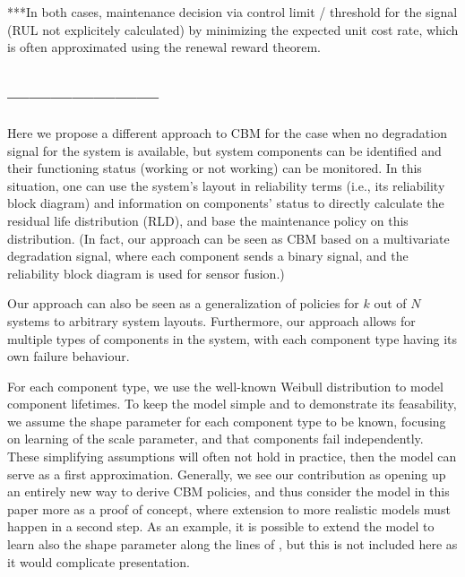 \documentclass[authoryear]{elsarticle}
\begin{document}
***In both cases, maintenance decision via control limit / threshold for the signal
(RUL not explicitely calculated)
by minimizing the expected unit cost rate,
which is often approximated using the renewal reward theorem.

\subsection*{---------------------}

Here we propose a different approach to CBM
for the case when no degradation signal for the system is available,
but system components can be identified and their functioning status
(working or not working) can be monitored.
In this situation, one can use the system's layout in reliability terms
(i.e., its reliability block diagram) and information on components' status
to directly calculate the residual life distribution (RLD),
and base the maintenance policy on this distribution.
(In fact, our approach can be seen as CBM based on a multivariate degradation signal,
where each component sends a binary signal, and the reliability block diagram is used
for sensor fusion.)

Our approach can also be seen as a generalization of policies for $k$ out of $N$ systems to arbitrary system layouts.
Furthermore, our approach allows for multiple types of components in the system,
with each component type having its own failure behaviour.

For each component type, we use the well-known Weibull distribution to model component lifetimes.
To keep the model simple and to demonstrate its feasability, we assume the shape parameter for each component type to be known,
focusing on learning of the scale parameter,
and that components fail independently.
These simplifying assumptions will often not hold in practice,
then the model can serve as a first approximation.
Generally, we see our contribution as opening up an entirely new way to derive CBM policies,
and thus consider the model in this paper more as a proof of concept,
where extension to more realistic models must happen in a second step.
As an example, it is possible to extend the model to learn also the shape parameter along the lines of
\cite{1969:soland},
but this is not included here as it would complicate presentation.
\end{document}
